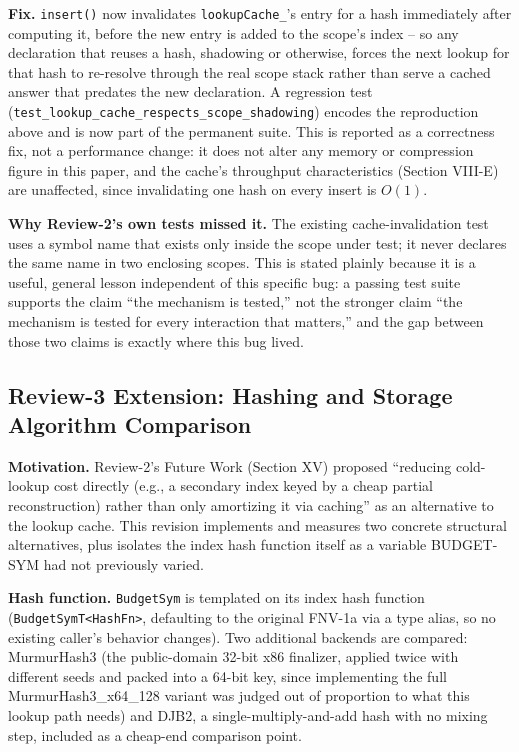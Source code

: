 \documentclass[conference]{IEEEtran}
\begin{document}
\textbf{Fix.} \texttt{insert()} now invalidates \texttt{lookupCache\_}'s
entry for a hash immediately after computing it, before the new entry is
added to the scope's index -- so any declaration that reuses a hash,
shadowing or otherwise, forces the next lookup for that hash to re-resolve
through the real scope stack rather than serve a cached answer that predates
the new declaration. A regression test
(\texttt{test\_lookup\_cache\_respects\_scope\_shadowing}) encodes the
reproduction above and is now part of the permanent suite. This is reported
as a correctness fix, not a performance change: it does not alter any
memory or compression figure in this paper, and the cache's throughput
characteristics (Section VIII-E) are unaffected, since invalidating one
hash on every insert is $O(1)$.

\textbf{Why Review-2's own tests missed it.} The existing cache-invalidation
test uses a symbol name that exists only inside the scope under test; it
never declares the same name in two enclosing scopes. This is stated
plainly because it is a useful, general lesson independent of this specific
bug: a passing test suite supports the claim ``the mechanism is tested,''
not the stronger claim ``the mechanism is tested for every interaction that
matters,'' and the gap between those two claims is exactly where this bug
lived.

\subsection{Review-3 Extension: Hashing and Storage Algorithm Comparison}
\textbf{Motivation.} Review-2's Future Work (Section XV) proposed
``reducing cold-lookup cost directly (e.g., a secondary index keyed by a
cheap partial reconstruction) rather than only amortizing it via caching''
as an alternative to the lookup cache. This revision implements and
measures two concrete structural alternatives, plus isolates the index hash
function itself as a variable BUDGET-SYM had not previously varied.

\textbf{Hash function.} \texttt{BudgetSym} is templated on its index hash
function (\texttt{BudgetSymT<HashFn>}, defaulting to the original FNV-1a via
a type alias, so no existing caller's behavior changes). Two additional
backends are compared: MurmurHash3 \cite{appleby-murmur} (the public-domain
32-bit x86 finalizer, applied twice with different seeds and packed into a
64-bit key, since implementing the full MurmurHash3\_x64\_128 variant was
judged out of proportion to what this lookup path needs) and DJB2, a
single-multiply-and-add hash with no mixing step, included as a
cheap-end comparison point.
\end{document}
